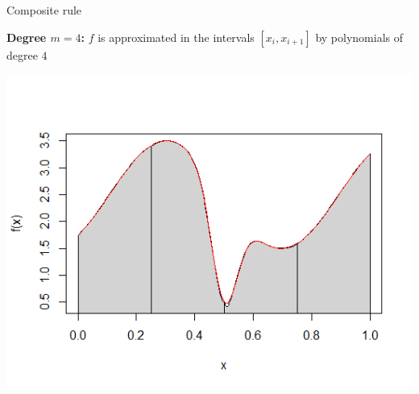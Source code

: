 \documentclass[11pt,compress,t,notes=noshow, xcolor=table]{beamer}
\begin{document}
\begin{vbframe}{Composite rule}

\framebreak

\textbf{Degree $m = 4$:} $f$ is approximated in the intervals $[x_i, x_{i + 1}]$ by polynomials of degree $4$

\begin{center}
\includegraphics[width = .7\textwidth]{figure_man/deg7.png}
\end{center}


%
%

\end{vbframe}











\end{document}
